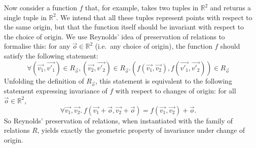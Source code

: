 Now consider a function $f$ that, for example, takes two tuples in
$\mathbb{R}^2$ and returns a single tuple in $\mathbb{R}^2$. We intend
that all these tuples represent points with respect to the same
origin, but that the function itself should be invariant with respect
to the choice of origin. We use Reynolds' idea of preservation of
relations to formalise this: for any $\vec{o} \in \mathbb{R}^2$
(i.e.~any choice of origin), the function $f$ should satisfy the
following statement:
\begin{equation}\label{eq:f-preserve-rel-frame}
  \forall (\vec{v_1},\vec{v'_1}) \in R_{\vec{o}}, (\vec{v_2},\vec{v'_2}) \in R_{\vec{o}}. (f(\vec{v_1}, \vec{v_2}), f(\vec{v'_1}, \vec{v'_2})) \in R_{\vec{o}}
\end{equation}
Unfolding the definition of $R_{\vec{o}}$, this statement is
equivalent to the following statement expressing invariance of $f$
with respect to changes of origin: for all $\vec{o} \in \mathbb{R}^2$,
\begin{equation}\label{eq:f-invariant-frame}
  \forall \vec{v_1}, \vec{v_2}.\ f(\vec{v_1} + \vec{o},\vec{v_2} + \vec{o}) = f(\vec{v_1},\vec{v_2}) + \vec{o}.
\end{equation}
So Reynolds' preservation of relations, when instantiated with the
family of relations $R$, yields exactly the geometric property of
invariance under change of origin.

